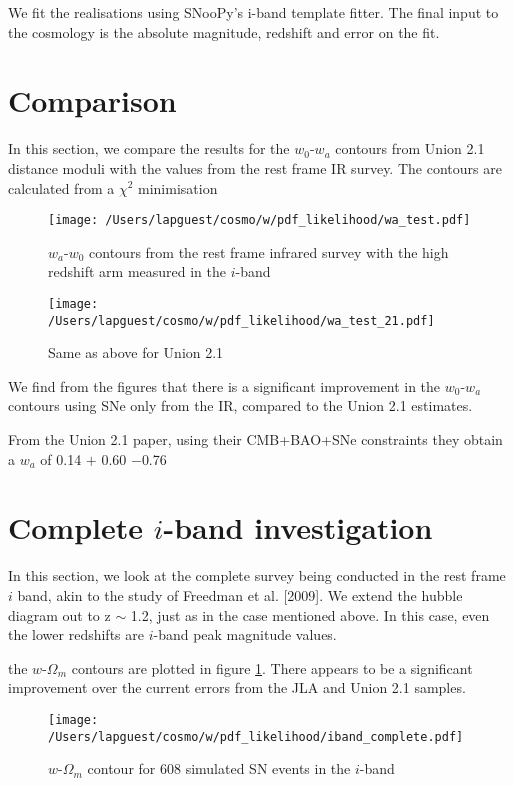 \documentclass{article}
\begin{document}
We fit the realisations using SNooPy's i-band template fitter. The final input to the cosmology is the absolute magnitude, redshift and error on the fit. 


\section{Comparison}
In this section, we compare the results for the $w_0$-$w_a$ contours from Union 2.1 distance moduli with the values from the rest frame IR survey. 
The contours are calculated from a $\chi^2$ minimisation

\begin{figure}
\texttt{[image: /Users/lapguest/cosmo/w/pdf\_likelihood/wa\_test.pdf]}
\caption{$w_a$-$w_0$ contours from the rest frame infrared survey with the high redshift arm measured in the $i$-band}
\end{figure}

\begin{figure}
\texttt{[image: /Users/lapguest/cosmo/w/pdf\_likelihood/wa\_test\_21.pdf]}
\caption{Same as above for Union 2.1}
\end{figure}

We find from the figures that there is a significant improvement in the $w_0$-$w_a$ contours using SNe only from the IR, compared to the Union 2.1 estimates. 

From the Union 2.1 paper, using their CMB+BAO+SNe constraints they obtain a $w_a$ of 0.14 $+$ 0.60 $-$0.76

\section{Complete $i$-band investigation}
In this section, we look at the complete survey being conducted in the rest frame $i$ band, akin to the study of Freedman et al. [2009]. We extend the hubble diagram out to z $\sim$ 1.2, just as in the case mentioned above. In this case, even the lower redshifts are $i$-band peak magnitude values. 

the $w$-$\Omega_{m}$ contours are plotted in figure \ref{fig:i_comp}. There appears to be a significant improvement over the current errors from the JLA and Union 2.1 samples. 

\begin{figure}
\texttt{[image: /Users/lapguest/cosmo/w/pdf\_likelihood/iband\_complete.pdf]}
\caption{$w$-$\Omega_{m}$ contour for 608 simulated SN events in the $i$-band}
\label{fig:i_comp}
\end{figure}
\end{document}

